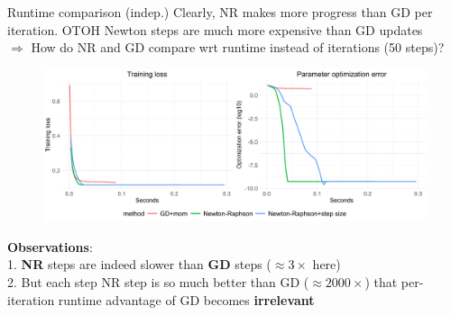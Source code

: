 \documentclass[11pt,compress,t,notes=noshow, xcolor=table]{beamer}
\begin{document}
\begin{vbframe}{Runtime comparison (indep.)}
\vspace{-0.2cm}
{\small Clearly, NR makes more progress than GD per iteration. OTOH Newton steps are much more expensive than GD updates\\
$\Rightarrow$ How do NR and GD compare wrt runtime instead of iterations (50 steps)?}
\begin{figure}
            \includegraphics[width=1.0\textwidth]{slides/05-multivariate-second-order/figure_man/simu-newton/NR_GD_runtime_comparison.pdf} \\
\end{figure} 
\vspace{-0.3cm}
\textbf{Observations}:\\ 1. \textbf{NR} steps are indeed slower than \textbf{GD} steps ($\approx 3\times$ here)\\
2. But each step NR step is so much better than GD ($\approx 2000 \times$) that per-iteration runtime advantage of GD becomes \textbf{irrelevant}\\
\end{vbframe}
\end{document}
